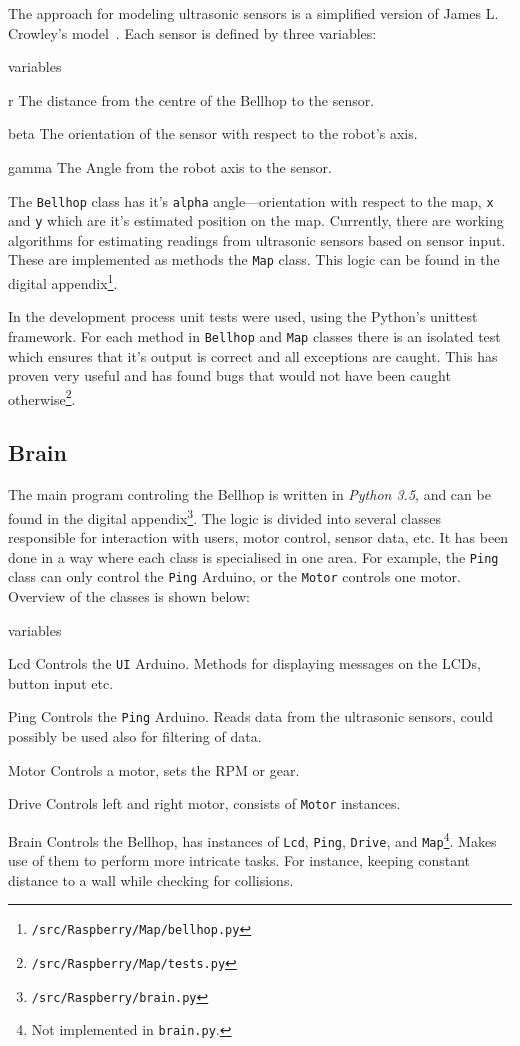 \documentclass[11pt]{article}
\begin{document}
The approach for modeling ultrasonic sensors is a simplified version of James L. Crowley's model~\cite{ultrasonicpaper}. Each sensor is defined by three variables:
\begin{labeling}{variables}
\item [r] The distance from the centre of the Bellhop to the sensor.
\item [beta] The orientation of the sensor with respect to the robot's axis.
\item [gamma] The Angle from the robot axis to the sensor.
\end{labeling}
The \texttt{Bellhop} class has it's \texttt{alpha} angle---orientation with respect to the map, \texttt{x} and \texttt{y} which are it's estimated position on the map. Currently, there are working algorithms for estimating readings from ultrasonic sensors based on sensor input. These are implemented as methods the \texttt{Map} class. This logic can be found in the digital appendix\footnote{\texttt{/src/Raspberry/Map/bellhop.py}}.


In the development process unit tests were used, using the Python's unittest~\cite{unittest} framework. For each method in \texttt{Bellhop} and \texttt{Map} classes there is an isolated test which ensures that it's output is correct and all exceptions are caught. This has proven very useful and has found bugs that would not have been caught otherwise\footnote{\texttt{/src/Raspberry/Map/tests.py}}.
\subsection*{Brain}
The main program controling the Bellhop is written in \textit{Python 3.5}, and can be found in the digital appendix\footnote{\texttt{/src/Raspberry/brain.py}}. The logic is divided into several classes responsible for interaction with users, motor control, sensor data, etc. It has been done in a way where each class is specialised in one area. For example, the \texttt{Ping} class can only control the \texttt{Ping} Arduino, or the \texttt{Motor} controls one motor. Overview of the classes is shown below:
\begin{labeling}{variables}
\item [Lcd] Controls the \texttt{UI} Arduino. Methods for displaying messages on the LCDs, button input etc.
\item [Ping] Controls the \texttt{Ping} Arduino. Reads data from the ultrasonic sensors, could possibly be used also for filtering of data.
\item [Motor] Controls a motor, sets the RPM or gear.
\item [Drive] Controls left and right motor, consists of \texttt{Motor} instances.
\item [Brain] Controls the Bellhop, has instances of \texttt{Lcd}, \texttt{Ping}, \texttt{Drive}, and \texttt{Map}\footnote{Not implemented in \texttt{brain.py}.}. Makes use of them to perform more intricate tasks. For instance, keeping constant distance to a wall while checking for collisions.
\end{labeling}
\end{document}
